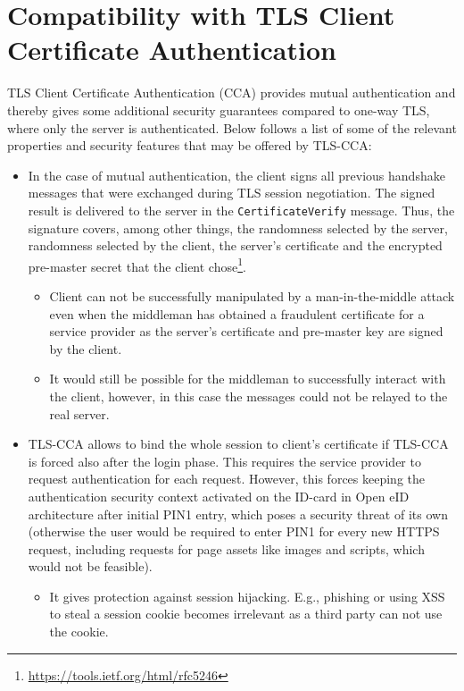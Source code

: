 \chapter{Compatibility with TLS Client Certificate Authentication}
\label{chapter:TLS-CCA}
TLS Client Certificate Authentication (CCA) provides mutual authentication and thereby gives some additional security guarantees compared to one-way TLS, where only the server is authenticated. Below follows a list of some of the relevant properties and security features that may be offered by TLS-CCA:

\begin{itemize}
\item In the case of mutual authentication, the client signs all previous handshake messages that were exchanged during TLS session negotiation. The signed result is delivered to the server in the \texttt{CertificateVerify} message. Thus, the signature covers, among other things, the randomness selected by the server, randomness selected by the client, the server's certificate and the encrypted pre-master secret that the client chose\footnote{\url{https://tools.ietf.org/html/rfc5246}}.

	\begin{itemize}
	\item Client can not be successfully manipulated by a man-in-the-middle attack even when the middleman has obtained a fraudulent certificate for a service provider as the server's certificate and pre-master key are signed by the client.

	\item It would still be possible for the middleman to successfully interact with the client, however, in this case the messages could not be relayed to the real server.
	\end{itemize}

\item TLS-CCA allows to bind the whole session to client's certificate if TLS-CCA is forced also after the login phase. This requires the service provider to request authentication for each request. However, this forces keeping the authentication security context activated on the ID-card in Open eID architecture after initial PIN1 entry, which poses a security threat of its own (otherwise the user would be required to enter PIN1 for every new HTTPS request, including requests for page assets like images and scripts, which would not be feasible).

	\begin{itemize}
	\item It gives protection against session hijacking. E.g., phishing or using XSS to steal a session cookie becomes irrelevant as a third party can not use the cookie.
	\end{itemize}
\end{itemize}


